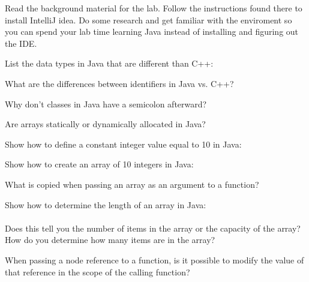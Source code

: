 \documentclass[../../main.tex]{subfiles}
\begin{document}
\begin{steps}
   \item Read the background material for the lab. Follow the instructions found there to install IntelliJ
      idea. Do some research and get familiar with the enviroment so you can spend your lab time learning 
      Java instead of installing and figuring out the IDE.
   \item List the data types in Java that are different than C++:\\
      \vspace{1cm}
   \item What are the differences between identifiers in Java vs. C++?\\
      \vspace{1cm}
   \item Why don't classes in Java have a semicolon afterward?\\
      \vspace{1cm}
   \item Are arrays statically or dynamically allocated in Java?\\
      \vspace{1cm}
   \item Show how to define a constant integer value equal to 10 in Java:\\
      \vspace{1cm}
   \item Show how to create an array of 10 integers in Java:\\
      \vspace{1cm}
   \item What is copied when passing an array as an argument to a function?\\
      \vspace{1cm}
   \item Show how to determine the length of an array in Java:\\
      \vspace{1cm}\\
      Does this tell you the number of items in the array or the capacity of the array?\\
      How do you determine how many items are in the array?\\
      \vspace{1cm}
   \item When passing a node reference to a function, is it possible to modify the value of that reference in the scope of the calling function?\\
      \vspace{1cm}
\end{steps}
\end{document}
